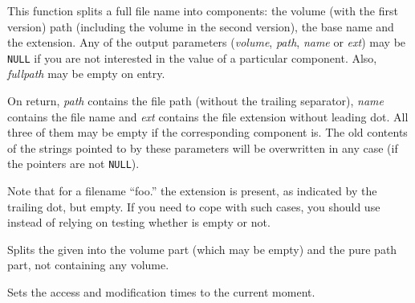 

This function splits a full file name into components: the volume (with the
first version) path (including the volume in the second version), the base name
and the extension. Any of the output parameters ({\it volume}, {\it path}, 
{\it name} or {\it ext}) may be {\tt NULL} if you are not interested in the
value of a particular component. Also, {\it fullpath} may be empty on entry.

On return, {\it path} contains the file path (without the trailing separator), 
{\it name} contains the file name and {\it ext} contains the file extension
without leading dot. All three of them may be empty if the corresponding
component is. The old contents of the strings pointed to by these parameters
will be overwritten in any case (if the pointers are not {\tt NULL}).

Note that for a filename ``foo.'' the extension is present, as indicated by the
trailing dot, but empty. If you need to cope with such cases, you should use 
 instead of relying on testing whether  is empty or not.


\label{wxfilenamesplitvolume}


Splits the given  into the volume part (which may be empty) and
the pure path part, not containing any volume.




\label{wxfilenametouch}


Sets the access and modification times to the current moment.


\label{wxfilenameoperatorassign}

